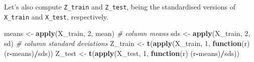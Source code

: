\documentclass[10pt,b5paper,krantz1]{krantz}
\newenvironment{Shaded}{\begin{snugshade}}{\end{snugshade}}
\newcommand{\CommentTok}[1]{\textcolor[rgb]{0.37,0.37,0.37}{\textit{#1}}}
\newcommand{\ControlFlowTok}[1]{\textcolor[rgb]{0.27,0.27,0.27}{\textbf{#1}}}
\newcommand{\DecValTok}[1]{\textcolor[rgb]{0.06,0.06,0.06}{#1}}
\newcommand{\KeywordTok}[1]{\textcolor[rgb]{0.27,0.27,0.27}{\textbf{#1}}}
\newcommand{\NormalTok}[1]{#1}
\newcommand{\OperatorTok}[1]{\textcolor[rgb]{0.43,0.43,0.43}{\textbf{#1}}}
\newcommand{\StringTok}[1]{\textcolor[rgb]{0.5,0.5,0.5}{#1}}
\begin{document}
Let's also compute \texttt{Z\_train} and \texttt{Z\_test}, being the standardised versions of \texttt{X\_train}
and \texttt{X\_test}, respectively.

\begin{Shaded}
\begin{Highlighting}[]
\NormalTok{means <-}\StringTok{ }\KeywordTok{apply}\NormalTok{(X_train, }\DecValTok{2}\NormalTok{, mean) }\CommentTok{# column means}
\NormalTok{sds   <-}\StringTok{ }\KeywordTok{apply}\NormalTok{(X_train, }\DecValTok{2}\NormalTok{, sd)   }\CommentTok{# column standard deviations}
\NormalTok{Z_train <-}\StringTok{ }\KeywordTok{t}\NormalTok{(}\KeywordTok{apply}\NormalTok{(X_train, }\DecValTok{1}\NormalTok{, }\ControlFlowTok{function}\NormalTok{(r) (r}\OperatorTok{-}\NormalTok{means)}\OperatorTok{/}\NormalTok{sds))}
\NormalTok{Z_test  <-}\StringTok{ }\KeywordTok{t}\NormalTok{(}\KeywordTok{apply}\NormalTok{(X_test,  }\DecValTok{1}\NormalTok{, }\ControlFlowTok{function}\NormalTok{(r) (r}\OperatorTok{-}\NormalTok{means)}\OperatorTok{/}\NormalTok{sds))}
\end{Highlighting}
\end{Shaded}
\end{document}
